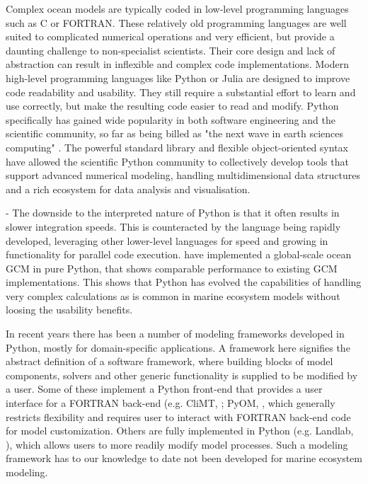 \documentclass[journal abbreviation, manuscript]{copernicus}
\begin{document}
Complex ocean models are typically coded in low-level programming languages such as C or FORTRAN. These relatively old programming languages are well suited to complicated numerical operations and very efficient, but provide a daunting challenge to non-specialist scientists. Their core design and lack of abstraction can result in inflexible and complex code implementations.
Modern high-level programming languages like Python or Julia are designed to improve code readability and usability. They still require a substantial effort to learn and use correctly, but make the resulting code easier to read and modify. Python specifically has gained wide popularity in both software engineering and the scientific community, so far as being billed as "the next wave in earth sciences computing" \citep{Lin2012}. The powerful standard library and flexible object-oriented syntax have allowed the scientific Python community to collectively develop tools that support advanced numerical modeling, handling multidimensional data structures and a rich ecosystem for data analysis and visualisation.

-
The downside to the interpreted nature of Python is that it often results in slower integration speeds. This is counteracted by the language being rapidly developed, leveraging other lower-level languages for speed and growing in functionality for parallel code execution.
\citet{Hafner2018VerosPython} have implemented a global-scale ocean GCM in pure Python, that shows comparable performance to existing GCM implementations. This shows that Python has evolved the capabilities of handling very complex calculations as is common in marine ecosystem models without loosing the usability benefits.


In recent years there has been a number of modeling frameworks developed in Python, mostly for domain-specific applications. A framework here signifies the abstract definition of a software framework, where building blocks of model components, solvers and other generic functionality is supplied to be modified by a user. Some of these implement a Python front-end that provides a user interface for a FORTRAN back-end (e.g. CliMT, \citet{Monteiro2016TheToolkit}; PyOM, \citet{Eden2016ClosingModel}, which generally restricts flexibility and requires user to interact with FORTRAN back-end code for model customization. Others are fully implemented in Python (e.g. Landlab, \citet{Hobley2017CreativeDynamics}), which allows users to more readily modify model processes. Such a modeling framework has to our knowledge to date not been developed for marine ecosystem modeling.
\end{document}
